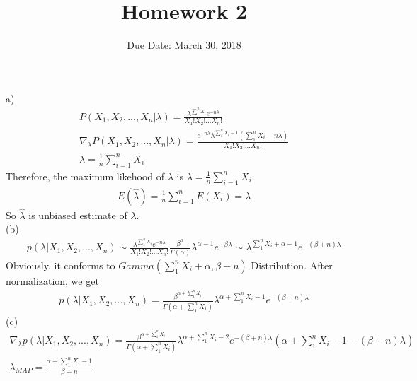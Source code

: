 \documentclass[12pt]{article}
\newenvironment{solution}[2][Solution]{\begin{trivlist}
\item[\hskip \labelsep {\bfseries #1}\hskip \labelsep {\bfseries #2.}]}{\end{trivlist}}
\begin{document}
\title{Homework 2}
\author{Due Date: March 30, 2018}
\date{}

\maketitle

\begin{solution}{1}
(a) 
\begin{align*}
P(X_{1},X_{2},...,X_{n}|\lambda) = \frac{\lambda^{\sum_1^n X_i}e^{-n\lambda}}{X_1!X_2!...X_n!}\\
\nabla_{\lambda}  P(X_{1},X_{2},...,X_{n}|\lambda) = \frac{e^{-n\lambda}\lambda^{\sum_1^n X_i-1}(\sum_1^n X_i  - n \lambda)}{X_1!X_2!...X_n!}\\
\lambda = \frac{1}{n}\sum_{i=1}^nX_{i}
\end{align*}
Therefore, the maximum likehood of $\lambda$ is $\lambda = \frac{1}{n}\sum_{i=1}^nX_{i}
$.
\begin{align*}
E(\widehat{\lambda}) = \frac{1}{n}\sum_{i=1}^nE(X_{i}) = \lambda
\end{align*}
So $\widehat{\lambda}$ is unbiased estimate of $\lambda$.\\
(b)
\begin{align*}
p(\lambda|X_1,X_2,...,X_n) \sim \frac{\lambda^{\sum_1^n X_i}e^{-n\lambda}}{X_1!X_2!...X_n!}\frac{\beta^\alpha}{\Gamma(\alpha)}\lambda^{\alpha - 1}e^{-\beta\lambda} \sim \lambda^{\sum_1^n X_i+\alpha-1}e^{-(\beta+n)\lambda}
\end{align*}
Obviously, it conforms to $Gamma(\sum_1^n X_i+\alpha, \beta+n)$ Distribution. After normalization, we get
\begin{align*}
p(\lambda|X_1,X_2,...,X_n) = \frac{\beta^{\alpha+\sum_1^n X_i}}{\Gamma({\alpha+\sum_1^n X_i})}\lambda^{{\alpha+\sum_1^n X_i} - 1}e^{-(\beta+n)\lambda}
\end{align*}
(c)
\begin{align*}
\nabla_{\lambda} p(\lambda|X_1,X_2,...,X_n) = \frac{\beta^{\alpha+\sum_1^n X_i}}{\Gamma({\alpha+\sum_1^n X_i})}\lambda^{{\alpha+\sum_1^n X_i} - 2}e^{-(\beta+n)\lambda}(\alpha+\sum_1^n X_i - 1 - (\beta + n)\lambda)\\
\lambda_{MAP} = \frac{\alpha+\sum_1^n X_i - 1}{\beta + n}
\end{align*}

\end{solution}
\end{document}
